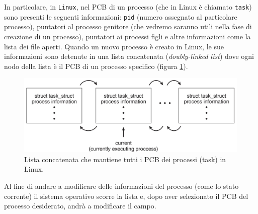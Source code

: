 \noindent In particolare, in \texttt{Linux}, nel PCB di un processo (che in Linux è chiamato \texttt{task}) sono presenti le seguenti informazioni: \texttt{pid} (numero assegnato al particolare processo), puntatori al processo genitore (che vedremo saranno utili nella fase di creazione di un processo), puntatori ai processi figli e altre informazioni come la lista dei file aperti. Quando un nuovo processo è creato in Linux, le sue informazioni sono detenute in una lista concatenata (\textit{doubly-linked list}) dove ogni nodo della lista è il PCB di un processo specifico (figura \ref{fig:process_table}). 
\begin{figure}[h]
    \centering
    \includegraphics[width = .75\textwidth]{../res/imgs/processes/process_table.png}
    \caption{Lista concatenata che mantiene tutti i PCB dei processi (task) in Linux.}
    \label{fig:process_table}
\end{figure}
Al fine di andare a modificare delle informazioni del processo (come lo stato corrente) il sistema operativo scorre la lista e, dopo aver selezionato il PCB del processo desiderato, andrà a modificare il campo. 

% 
